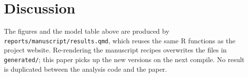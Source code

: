\section{Discussion}

The figures and the model table above are produced by
\texttt{reports/manuscript/results.qmd}, which reuses the same R functions as
the project website. Re-rendering the manuscript recipes overwrites the files in
\texttt{generated/}; this paper picks up the new versions on the next compile.
No result is duplicated between the analysis code and the paper.
